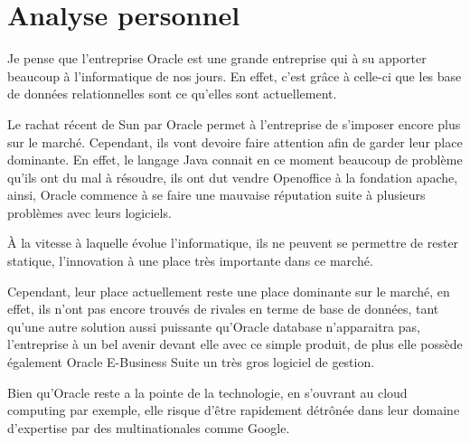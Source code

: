 \documentclass{article}
\begin{document}
	\section{Analyse personnel}
	Je pense que l'entreprise Oracle est une grande entreprise qui à su apporter beaucoup à l'informatique de nos jours. En effet,
	c'est grâce à celle-ci que les base de données relationnelles sont ce qu'elles sont actuellement. 

	Le rachat récent de Sun par Oracle permet à l'entreprise de s'imposer encore plus sur le marché. Cependant, ils vont devoire
	faire attention afin de garder leur place dominante. En effet, le langage Java connait en ce moment beaucoup de problème qu'ils
	ont du mal à résoudre, ils ont dut vendre Openoffice à la fondation apache, ainsi, Oracle commence à se faire une mauvaise
	réputation suite à plusieurs problèmes avec leurs logiciels. 

À la vitesse à laquelle évolue l'informatique,
	ils ne peuvent se permettre de rester statique, l'innovation à une place très importante dans ce marché.
	
	Cependant, leur place actuellement reste une place dominante sur le marché, en effet, ils n'ont pas encore trouvés de rivales en
	terme de base de données, tant qu'une autre solution aussi puissante qu'Oracle database n'apparaitra pas, l'entreprise à un bel
	avenir devant elle avec ce simple produit, de plus elle possède également Oracle E-Business Suite  un très gros logiciel de
	gestion. 

	Bien qu'Oracle reste a la pointe de la technologie, en s'ouvrant au cloud computing par exemple, elle risque d'être rapidement
	détrônée dans leur domaine d'expertise par des multinationales comme Google.
\end{document}
